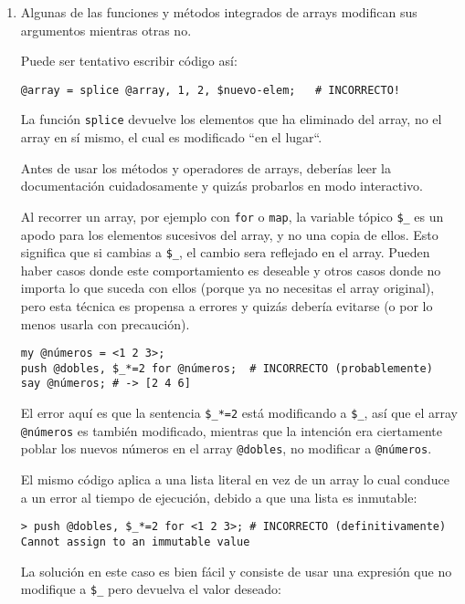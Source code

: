 \begin{enumerate}

\item Algunas de las funciones y métodos integrados de arrays
modifican sus argumentos mientras otras no.

Puede ser tentativo escribir código así:

\begin{lstlisting}
@array = splice @array, 1, 2, $nuevo-elem;   # INCORRECTO!
\end{lstlisting}

La función {\tt splice} devuelve los elementos
que ha eliminado del array, no el array en sí mismo,
el cual es modificado ``en el lugar``.

Antes de usar los métodos y operadores de arrays,
deberías leer la documentación cuidadosamente y quizás
probarlos en modo interactivo.

Al recorrer un array, por ejemplo con {\tt for}
o {\tt map}, la variable tópico \verb|$_| es
un apodo para los elementos sucesivos del array,
y no una copia de ellos. Esto significa que si
cambias a \verb|$_|, el cambio sera reflejado en
el array. Pueden haber casos donde este comportamiento
es deseable y otros casos donde no importa lo que suceda
con ellos (porque ya no necesitas el array original),
pero esta técnica es propensa a errores y quizás debería
evitarse (o por lo menos usarla con precaución).

\begin{lstlisting}
my @números = <1 2 3>;
push @dobles, $_*=2 for @números;  # INCORRECTO (probablemente)
say @números; # -> [2 4 6]
\end{lstlisting}

El error aquí es que la sentencia \verb|$_*=2| está
modificando a \verb|$_|, así que el array \verb|@números|
es también modificado, mientras que la intención era 
ciertamente poblar los nuevos números en el array
\verb|@dobles|, no modificar a \verb|@números|.

El mismo código aplica a una lista literal en vez de 
un array lo cual conduce a un error al tiempo de 
ejecución, debido a que una lista es inmutable:

\begin{lstlisting}
> push @dobles, $_*=2 for <1 2 3>; # INCORRECTO (definitivamente)
Cannot assign to an immutable value
\end{lstlisting}

La solución en este caso es bien fácil y consiste
de usar una expresión que no modifique a \verb|$_|
pero devuelva el valor deseado:


\end{enumerate}
